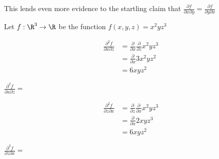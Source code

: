 \documentclass{ximera}
\begin{document}
\begin{question}
		This lends even more evidence to the startling claim that $\frac{\partial f}{\partial x \partial y} = \frac{\partial f}{\partial y \partial x}$
	\end{question}
	
	\begin{question}
		Let $f:\R^3 \to \R$ be the function $f(x,y,z) = x^2yz^3$
		\begin{solution}
			\begin{hint}
				\begin{align*}
					\frac{\partial^2 f}{\partial x \partial z} &= \frac{\partial }{ \partial x} \frac{\partial}{ \partial z} x^2yz^3\\
						&=\frac{\partial }{ \partial x} 3x^2yz^2\\
						&= 6xyz^2
				\end{align*}
			\end{hint}
			$\frac{\partial^2 f}{\partial x \partial z} = $
		\end{solution}
		\begin{solution}
		\begin{hint}
				\begin{align*}
					\frac{\partial^2 f}{\partial z \partial x} &= \frac{\partial }{ \partial z} \frac{\partial}{ \partial x} x^2yz^3\\
						&=\frac{\partial }{ \partial x} 2xyz^3\\
						&= 6xyz^2
				\end{align*}
			\end{hint}
			$\frac{\partial^2 f}{\partial z \partial x} = $\answer{6xyz^2}
		\end{solution}
	\end{question}
	
\end{document}
